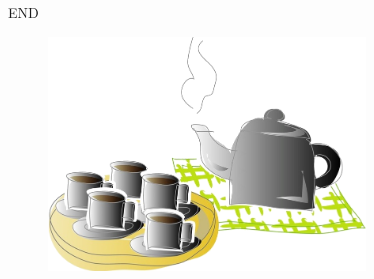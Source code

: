 \begin{frame}
\begin{center}
    \Huge END
\end{center}
\begin{figure}
    \includegraphics[width=0.75\textwidth]{figure/relax.png}
\end{figure}
\end{frame}
